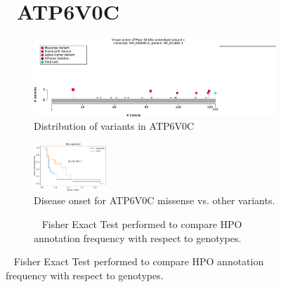 \begin{figure}[htbp]
\section*{ ATP6V0C}
\centering
\begin{subfigure}[b]{0.95\textwidth}
\centering
\includegraphics[width=\textwidth]{ img/ATP6V0C_protein_diagram.pdf} 
\captionsetup{justification=raggedright,singlelinecheck=false}
\caption{Distribution of variants in ATP6V0C}
\end{subfigure}

\vspace{2em}

\begin{subfigure}[b]{0.95\textwidth}
\centering
\includegraphics[width=0.3\textwidth]{ img/ATP6V0C_stats.pdf} 
\captionsetup{justification=raggedright,singlelinecheck=false}
\caption{Disease onset for  ATP6V0C missense vs. other variants.}
\end{subfigure}

\vspace{2em}

\begin{subfigure}[b]{0.95\textwidth}
\centering
{}
\captionsetup{justification=raggedright,singlelinecheck=false}
\caption{             Fisher Exact Test performed to compare HPO annotation frequency with respect to genotypes. }
\end{subfigure}


\end{figure}
